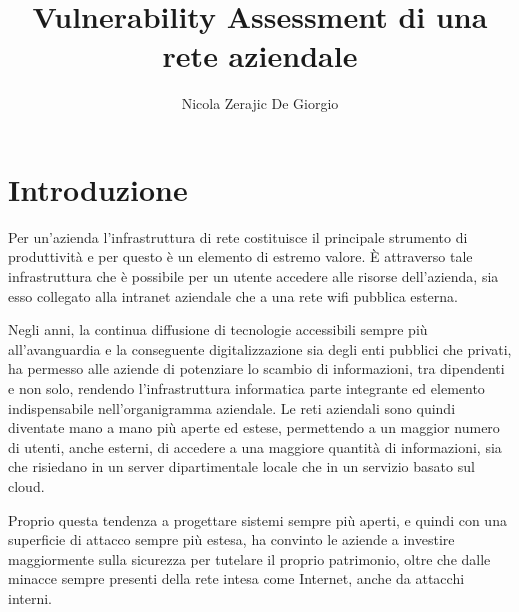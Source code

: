 \documentclass[target=bach,aauheader=]{thud}
\title{Vulnerability Assessment di una rete aziendale}
\author{Nicola Zerajic De Giorgio}
\begin{document}
\maketitle

\tableofcontents


\listoffigures

\mainmatter


\chapter{Introduzione}

Per un’azienda l’infrastruttura di rete costituisce il principale strumento di produttività e per questo è un elemento di estremo valore. È attraverso tale infrastruttura che è possibile per un utente accedere alle risorse dell'azienda, sia esso collegato alla intranet aziendale che a una rete wifi pubblica esterna.

Negli anni, la continua diffusione di tecnologie accessibili sempre più all’avanguardia e la conseguente digitalizzazione sia degli enti pubblici che privati, ha permesso alle aziende di potenziare lo scambio di informazioni, tra dipendenti e non solo, rendendo l’infrastruttura informatica parte integrante ed elemento indispensabile nell’organigramma aziendale. Le reti aziendali sono quindi diventate mano a mano più aperte ed estese, permettendo a un maggior numero di utenti, anche esterni, di accedere a una maggiore quantità di informazioni, sia che risiedano in un server dipartimentale locale che in un servizio basato sul cloud.

Proprio questa tendenza a progettare sistemi sempre più aperti, e quindi con una superficie di attacco sempre più estesa, ha convinto le aziende a investire maggiormente sulla sicurezza per tutelare il proprio patrimonio, oltre che dalle minacce sempre presenti della rete intesa come Internet, anche da attacchi interni.
\end{document}
